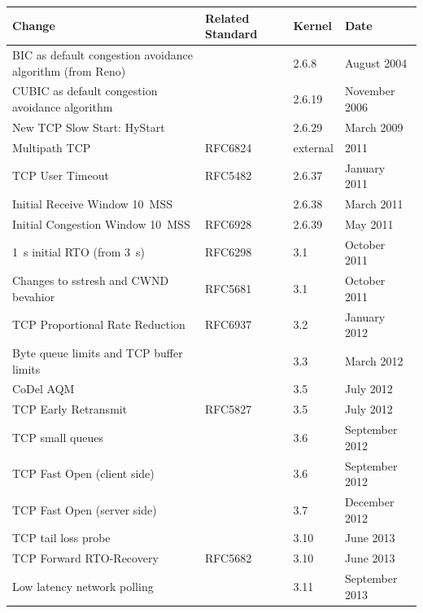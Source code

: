 \begin{table}[htb]
	\begin{tabu}{X[1.4]XX[0.4]X[0.7]}
	\toprule
	\textbf{Change} & \textbf{Related Standard} & \textbf{Kernel} & \textbf{Date} \\
	\midrule
	BIC as default congestion avoidance algorithm (from Reno) & & 2.6.8 & August 2004 \\
	CUBIC as default congestion avoidance algorithm & \cite{ha2008cubic} & 2.6.19 & November 2006 \\
	New TCP Slow Start: HyStart & \cite{Ha20112092} & 2.6.29 & March 2009 \\
	Multipath TCP & RFC6824 & external & 2011 \\
	TCP User Timeout & RFC5482~\cite{rfc5482} & 2.6.37 & January 2011 \\
	Initial Receive Window \SI{10}{MSS} & \cite{rfc6928} & 2.6.38 & March 2011 \\
	Initial Congestion Window \SI{10}{MSS} & RFC6928~\cite{rfc6928} & 2.6.39 & May 2011 \\
	\SI{1}{\second} initial RTO (from \SI{3}{\second}) & RFC6298 & 3.1 & October 2011 \\
	Changes to sstresh and CWND bevahior & RFC5681~\cite{rfc5681} & 3.1 & October 2011 \\ %
	TCP Proportional Rate Reduction & RFC6937~\cite{rfc6937} & 3.2 & January 2012 \\
	Byte queue limits and TCP buffer limits &  & 3.3 & March 2012 \\ %
	CoDel AQM & \cite{nichols2014codel} & 3.5 & July 2012 \\
	TCP Early Retransmit & RFC5827~\cite{rfc5827} & 3.5 & July 2012 \\
	TCP small queues & & 3.6 & September 2012 \\ %
	TCP Fast Open (client side) & \cite{cheng2014tcptfo} & 3.6 & September 2012 \\
	TCP Fast Open (server side) & & 3.7 & December 2012 \\
	TCP tail loss probe & & 3.10 & June 2013 \\ %
	TCP Forward RTO-Recovery & RFC5682~\cite{rfc5682} & 3.10 & June 2013 \\
	Low latency network polling & & 3.11 & September 2013 \\ %

\end{tabu}
\end{table}
